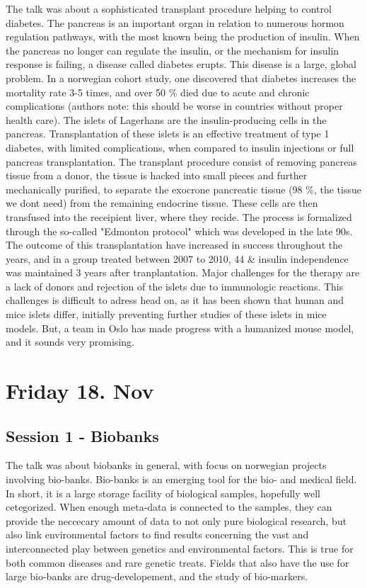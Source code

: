 \documentclass[12p]{article}
\begin{document}
The talk was about a sophisticated transplant procedure helping to control diabetes.
The pancreas is an important organ in relation to numerous hormon regulation pathways, with the most known being the production of insulin.
When the pancreas no longer can regulate the insulin, or the mechanism for insulin response is failing, a disease called diabetes erupts.
This disease is a large, global problem.
In a norwegian cohort study, one discovered that diabetes increases the mortality rate 3-5 times, and over 50 \% died due to acute and chronic complications (authors note: this should be worse in countries without proper health care).
The islets of Lagerhans are the insulin-producing cells in the pancreas.
Transplantation of these islets is an effective treatment of type 1 diabetes, with limited complications, when compared to insulin injections or full pancreas transplantation.
The transplant procedure consist of removing pancreas tissue from a donor, the tissue is hacked into small pieces and further mechanically purified, to separate the exocrone pancreatic tissue (98 \%, the tissue we dont need) from the remaining endocrine tissue.
These cells are then transfused into the receipient liver, where they recide.
The process is formalized through the so-called "Edmonton protocol" which was developed in the late 90s.
The outcome of this transplantation have increased in success throughout the years, and in a group treated between 2007 to 2010, 44 \& insulin independence was maintained 3 years after tranplantation.
Major challenges for the therapy are a lack of donors and rejection of the islets due to immunologic reactions.
This challenges is difficult to adress head on, as it has been shown that human and mice islets differ, initially preventing further studies of these islets in mice models.
But, a team in Oslo has made progress with a humanized mouse model, and it sounds very promising. 


\section*{Friday 18. Nov}

\subsection*{Session 1 - Biobanks}

The talk was about biobanks in general, with focus on norwegian projects involving bio-banks.
Bio-banks is an emerging tool for the bio- and medical field.
In short, it is a large storage facility of biological samples, hopefully well cetegorized.
When enough meta-data is connected to the samples, they can provide the neccecary amount of data to not only pure biological research, but also link environmental factors to find results concerning the vast and interconnected play between genetics and environmental factors.
This is true for both common diseases and rare genetic treats.
Fields that also have the use for large bio-banks are drug-developement, and the study of bio-markers.
\end{document}
